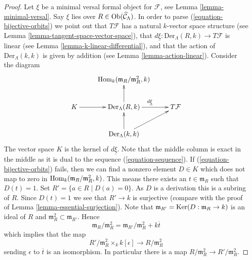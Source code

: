 \begin{proof}
Let $\xi$ be a minimal versal formal object for $\mathcal{F}$, see
Lemma \ref{lemma-minimal-versal}.
Say $\xi$ lies over $R \in \mathop{\mathrm{Ob}}\nolimits(\widehat{\mathcal{C}}_\Lambda)$.
In order to parse (\ref{equation-bijective-orbits}) we point out
that $T\mathcal{F}$ has a natural $k$-vector space structure
(see
Lemma \ref{lemma-tangent-space-vector-space}),
that $d\underline{\xi} : \text{Der}_\Lambda(R, k) \to T\mathcal{F}$
is linear (see
Lemma \ref{lemma-k-linear-differential}),
and that the action of $\text{Der}_\Lambda(k, k)$ is
given by addition (see
Lemma \ref{lemma-action-linear}).
Consider the diagram
$$
\xymatrix{
& \Hom_k(\mathfrak m_R/\mathfrak m_R^2, k) \\
K \ar[r] & \text{Der}_\Lambda(R, k) \ar[r]^{d\underline{\xi}} \ar[u] &
T\mathcal{F} \\
& \text{Der}_\Lambda(k, k) \ar[u] \ar[ru]
}
$$
The vector space $K$ is the kernel of $d\underline{\xi}$.
Note that the middle column is exact in the middle as it is dual to the
sequence (\ref{equation-sequence}). If (\ref{equation-bijective-orbits})
fails, then we can find a nonzero element $D \in K$ which
does not map to zero in $\mathop{\mathrm{Hom}}\nolimits_k(\mathfrak m_R/\mathfrak m_R^2, k)$.
This means there exists an $t \in \mathfrak m_R$ such that
$D(t) = 1$. Set $R' = \{a \in R \mid D(a) = 0\}$. As $D$ is a derivation
this is a subring of $R$. Since $D(t) = 1$ we see that $R' \to k$
is surjective (compare with the proof of
Lemma \ref{lemma-essential-surjection}).
Note that $\mathfrak m_{R'} = \mathop{\mathrm{Ker}}(D : \mathfrak m_R \to k)$
is an ideal of $R$ and $\mathfrak m_R^2 \subset \mathfrak m_{R'}$. Hence
$$
\mathfrak m_R/\mathfrak m_R^2 =
\mathfrak m_{R'}/\mathfrak m_R^2 + k\overline{t}
$$
which implies that the map
$$
R'/\mathfrak m_R^2 \times_k k[\epsilon] \to R/\mathfrak m_R^2
$$
sending $\epsilon$ to $\overline{t}$ is an isomorphism. In particular
there is a map $R/\mathfrak m_R^2 \to R'/\mathfrak m_R^2$.


\end{proof}
